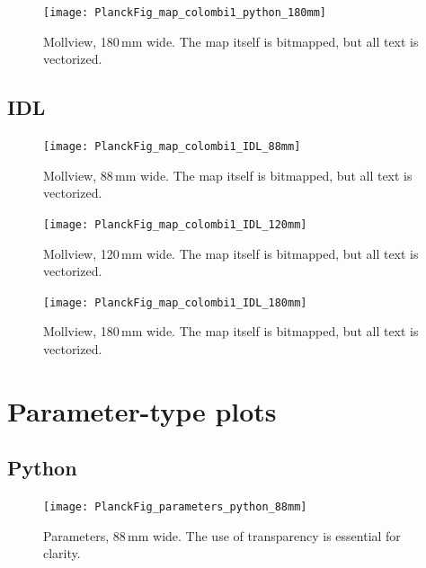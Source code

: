 \documentclass[traditabstract]{aa}
\begin{document}
\begin{figure}[H!b]
\texttt{[image: PlanckFig\_map\_colombi1\_python\_180mm]}
\caption{Mollview, 180\,mm wide.  The map itself is bitmapped, but all text is vectorized.}
\label{fig:map_parchment_python180}
\end{figure}


\clearpage


\subsection{IDL}



\begin{figure}[ht]
\texttt{[image: PlanckFig\_map\_colombi1\_IDL\_88mm]}
\caption{Mollview, 88\,mm wide.  The map itself is bitmapped, but all text is vectorized.} 
\label{fig:map_parchment_python88}
\end{figure}




\begin{figure}
\sidecaption
\texttt{[image: PlanckFig\_map\_colombi1\_IDL\_120mm]}
\caption{Mollview, 120\,mm wide.  The map itself is bitmapped, but all text is vectorized.} 
\label{fig:map_parchment_python120}
\end{figure}



\begin{figure}[H!b]
\texttt{[image: PlanckFig\_map\_colombi1\_IDL\_180mm]}
\caption{Mollview, 180\,mm wide.  The map itself is bitmapped, but all text is vectorized.}
\label{fig:map_parchment_python180}
\end{figure}


\clearpage



\section{Parameter-type plots}

\subsection{Python}


\begin{figure}[ht]
\texttt{[image: PlanckFig\_parameters\_python\_88mm]}
\caption{Parameters, 88\,mm wide.  The use of transparency is essential for clarity.}
\label{fig:parameters_python88}
\end{figure}
\end{document}
